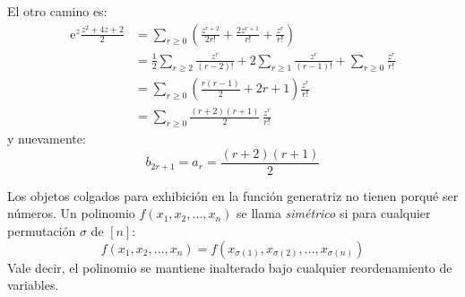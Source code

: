   El otro camino es:
  \begin{align*}
    \mathrm{e}^z \frac{z^2 + 4 z + 2}{2}
      &= \sum_{r \ge 0}
	   \left(
	     \frac{z^{r + 2}}{2 r!}
	       + \frac{2 z^{r + 1}}{r!}
	       + \frac{z^r}{r!}
	   \right) \\
      &= \frac{1}{2} \sum_{r \ge 2} \frac{z^r}{(r - 2)!}
	   + 2 \sum_{r \ge 1} \frac{z^r}{(r - 1)!}
	   + \sum_{r \ge 0} \frac{z^r}{r!} \\
      &= \sum_{r \ge 0}
	   \left(
	     \frac{r (r - 1)}{2}
	       + 2 r + 1
	   \right) \frac{z^r}{r!} \\
      &= \sum_{r \ge 0}
	   \frac{(r + 2) (r + 1)}{2} \, \frac{z^r}{r!}
  \end{align*}
  y nuevamente:
  \begin{equation*}
    b_{2 r + 1}
      = a_r
      = \frac{(r + 2) (r + 1)}{2}
  \end{equation*}

  Los objetos colgados para exhibición en la función generatriz
  no tienen porqué ser números.
  Un polinomio \(f(x_1, x_2, \dotsc, x_n)\)
  se llama \emph{simétrico}%
  si para cualquier permutación \(\sigma\) de \([n]\):
  \begin{equation}
    \label{eq:symmetric-polynomial-definition}
    f(x_1, x_2, \dotsc, x_n)
      = f(x_{\sigma(1)}, x_{\sigma(2)}, \dotsc, x_{\sigma(n)})
  \end{equation}
  Vale decir,
  el polinomio se mantiene inalterado
  bajo cualquier reordenamiento de variables.

